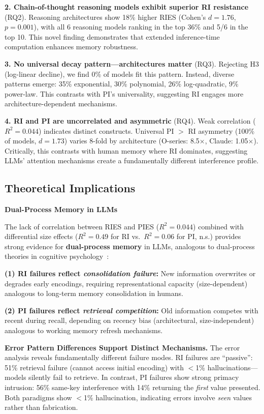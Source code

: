 \documentclass{article}
\begin{document}
\textbf{2. Chain-of-thought reasoning models exhibit superior RI resistance} (RQ2).
Reasoning architectures show 18\% higher RIES (Cohen's $d = 1.76$, $p = 0.001$), with all 6 reasoning models ranking in the top 36\% and 5/6 in the top 10. This novel finding demonstrates that extended inference-time computation enhances memory robustness.

\textbf{3. No universal decay pattern---architectures matter} (RQ3).
Rejecting H3 (log-linear decline), we find 0\% of models fit this pattern. Instead, diverse patterns emerge: 35\% exponential, 30\% polynomial, 26\% log-quadratic, 9\% power-law. This contrasts with PI's universality, suggesting RI engages more architecture-dependent mechanisms.

\textbf{4. RI and PI are uncorrelated and asymmetric} (RQ4).
Weak correlation ($R^2 = 0.044$) indicates distinct constructs. Universal PI $>$ RI asymmetry (100\% of models, $d = 1.73$) varies 8-fold by architecture (O-series: 8.5$\times$, Claude: 1.05$\times$). Critically, this contrasts with human memory where RI dominates, suggesting LLMs' attention mechanisms create a fundamentally different interference profile.

\subsection{Theoretical Implications}

\textbf{Dual-Process Memory in LLMs}

The lack of correlation between RIES and PIES ($R^2 = 0.044$) combined with differential size effects ($R^2 = 0.49$ for RI vs.\ $R^2 = 0.06$ for PI, n.s.) provides strong evidence for \textbf{dual-process memory} in LLMs, analogous to dual-process theories in cognitive psychology~\citep{baddeley1974working}:

\textbf{(1) RI failures reflect \textit{consolidation failure}:} New information overwrites or degrades early encodings, requiring representational capacity (size-dependent) analogous to long-term memory consolidation in humans.

\textbf{(2) PI failures reflect \textit{retrieval competition}:} Old information competes with recent during recall, depending on recency bias (architectural, size-independent) analogous to working memory refresh mechanisms.

\textbf{Error Pattern Differences Support Distinct Mechanisms.}
The error analysis reveals fundamentally different failure modes. RI failures are ``passive'': 51\% retrieval failure (cannot access initial encoding) with $<$1\% hallucinations---models silently fail to retrieve. In contrast, PI failures show strong primacy intrusion: 56\% same-key interference with 14\% returning the \textit{first} value presented. Both paradigms show $<$1\% hallucination, indicating errors involve \textit{seen} values rather than fabrication.
\end{document}
